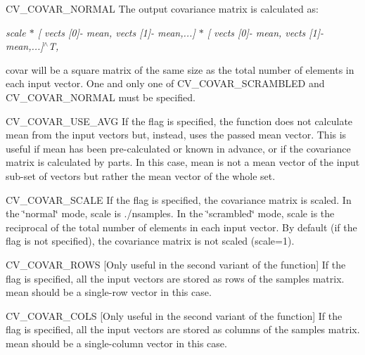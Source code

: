 \begin{DoxyItemize}
\item C\+V\+\_\+\+C\+O\+V\+A\+R\+\_\+\+N\+O\+R\+M\+AL The output covariance matrix is calculated as\+: 
\end{DoxyItemize}

{\itshape scale $\ast$ \mbox{[} vects \mbox{[}0\mbox{]}-\/ mean, vects \mbox{[}1\mbox{]}-\/ mean,...\mbox{]} $\ast$ \mbox{[} vects \mbox{[}0\mbox{]}-\/ mean, vects \mbox{[}1\mbox{]}-\/ mean,...\mbox{]}$^\wedge$T,}

{\ttfamily covar} will be a square matrix of the same size as the total number of elements in each input vector. One and only one of {\ttfamily C\+V\+\_\+\+C\+O\+V\+A\+R\+\_\+\+S\+C\+R\+A\+M\+B\+L\+ED} and {\ttfamily C\+V\+\_\+\+C\+O\+V\+A\+R\+\_\+\+N\+O\+R\+M\+AL} must be specified.


\begin{DoxyItemize}
\item C\+V\+\_\+\+C\+O\+V\+A\+R\+\_\+\+U\+S\+E\+\_\+\+A\+VG If the flag is specified, the function does not calculate {\ttfamily mean} from the input vectors but, instead, uses the passed {\ttfamily mean} vector. This is useful if {\ttfamily mean} has been pre-\/calculated or known in advance, or if the covariance matrix is calculated by parts. In this case, {\ttfamily mean} is not a mean vector of the input sub-\/set of vectors but rather the mean vector of the whole set. 
\item C\+V\+\_\+\+C\+O\+V\+A\+R\+\_\+\+S\+C\+A\+LE If the flag is specified, the covariance matrix is scaled. In the \char`\"{}normal\char`\"{} mode, {\ttfamily scale} is {./nsamples}. In the \char`\"{}scrambled\char`\"{} mode, {\ttfamily scale} is the reciprocal of the total number of elements in each input vector. By default (if the flag is not specified), the covariance matrix is not scaled ({\ttfamily scale=1}). 
\item C\+V\+\_\+\+C\+O\+V\+A\+R\+\_\+\+R\+O\+WS \mbox{[}Only useful in the second variant of the function\mbox{]} If the flag is specified, all the input vectors are stored as rows of the {\ttfamily samples} matrix. {\ttfamily mean} should be a single-\/row vector in this case. 
\item C\+V\+\_\+\+C\+O\+V\+A\+R\+\_\+\+C\+O\+LS \mbox{[}Only useful in the second variant of the function\mbox{]} If the flag is specified, all the input vectors are stored as columns of the {\ttfamily samples} matrix. {\ttfamily mean} should be a single-\/column vector in this case. 
\end{DoxyItemize}

